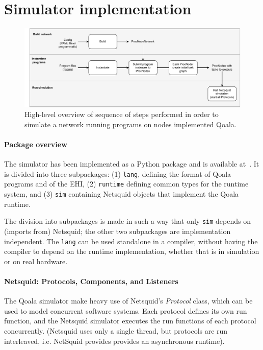 \section{Simulator implementation}
\label{qoala:sec:app:simulator}

\begin{figure}[t]
    \centering
    \includegraphics[width=\textwidth]{figures/qoala/simulator_sequence.pdf}
    \caption{High-level overview of sequence of steps performed in order to simulate a network running programs on nodes implemented Qoala.
    }
    \label{qoala:fig:app:simulator_sequence}
\end{figure}

\paragraph{Package overview}
The simulator has been implemented as a Python package and is available at~\cite{qoala2023simulator}.
It is divided into three subpackages: (1) \texttt{lang}, defining the format of Qoala programs and of the EHI, (2) \texttt{runtime} defining common types for the runtime system, and (3) \texttt{sim} containing Netsquid objects that implement the Qoala runtime.

The division into subpackages is made in such a way that only \texttt{sim} depends on (imports from) Netsquid; the other two subpackages are implementation independent.
The \texttt{lang} can be used standalone in a compiler, without having the compiler to depend on the runtime implementation, whether that is in simulation or on real hardware.


\paragraph{Netsquid: Protocols, Components, and Listeners}
The Qoala simulator make heavy use of Netsquid's \textit{Protocol} class,
which can be used to model concurrent software systems. 
Each protocol defines its own run function, and the Netsquid simulator
executes the run functions of each protocol concurrently.
(Netsquid uses only a single thread, but protocols are run interleaved, i.e. NetSquid provides provides an asynchronous runtime).

